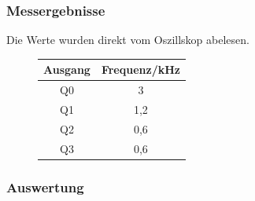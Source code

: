 \documentclass[12pt,a4paper]{article}
\begin{document}
\subsubsection*{Messergebnisse}

Die Werte wurden direkt vom Oszillskop abelesen.

\begin{figure}[H]
\centering
\begin{tabular}{|c|c|}
\hline Ausgang & Frequenz/kHz \\ \hline
\hline Q0 & 3 \\ 
\hline Q1 & 1,2 \\ 
\hline Q2 & 0,6 \\ 
\hline Q3 & 0,6 \\ 
\hline 
\end{tabular} 
\end{figure}


\subsubsection*{Auswertung}
\end{document}
